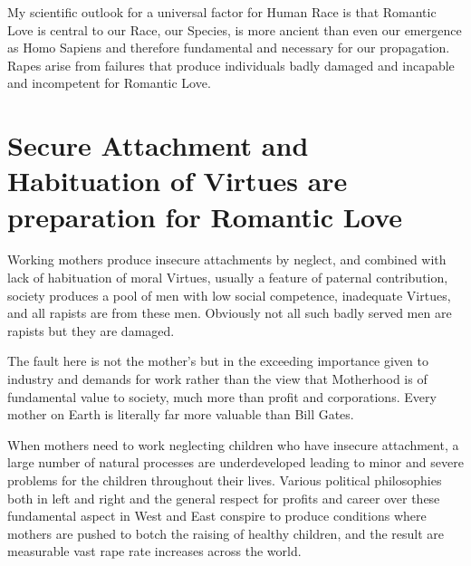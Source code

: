 \documentclass{amsart}
\begin{document}
My scientific outlook for a universal factor for Human Race is that Romantic Love is central to our Race, our Species, is more ancient than even our emergence as Homo Sapiens and therefore fundamental and necessary for our propagation.  Rapes arise from failures that produce individuals badly damaged and incapable and incompetent for Romantic Love. 

\section{Secure Attachment and Habituation of Virtues are preparation for Romantic Love}

Working mothers produce insecure attachments by neglect, and combined with lack of habituation of moral Virtues, usually a feature of paternal contribution, society produces a pool of men with low social competence, inadequate Virtues, and all rapists are from these men.  Obviously not all such badly served men are rapists but they are damaged.  

The fault here is not the mother's but in the exceeding importance given to industry and demands for work rather than the view that Motherhood is of fundamental value to society, much more than profit and corporations.  Every mother on Earth is literally far more valuable than Bill Gates.


When mothers need to work neglecting children who have insecure attachment, a large number of natural processes are underdeveloped leading to minor and severe problems for the children throughout their lives.  Various political philosophies both in left and right and the general respect for profits and career over these fundamental aspect in West and East conspire to produce conditions where mothers are pushed to botch the raising of healthy children, and the result are measurable vast rape rate increases across the world.
\end{document}
